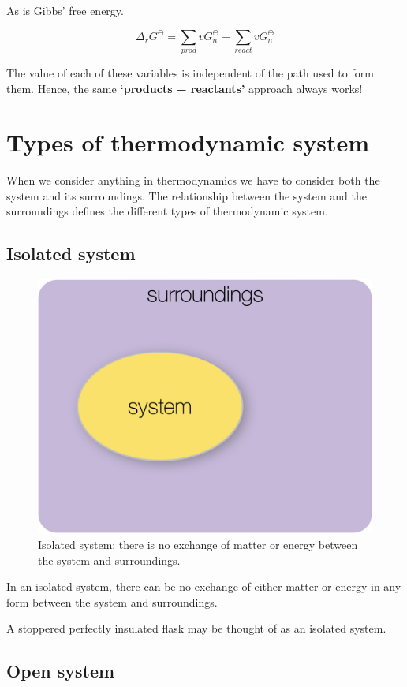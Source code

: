 \documentclass[
]{book}
\begin{document}
As is Gibbs' free energy.

\begin{equation}
\Delta _ r G^\ominus = \sum_{prod} v G_n^\ominus - \sum_{react} v  G_n^\ominus 
\label{eq:Gibbsstate}
\end{equation}

The value of each of these variables is independent of the path used to form them. Hence, the same \textbf{`products − reactants'} approach always works!

\hypertarget{sec:typesofsystem}{%
\section{Types of thermodynamic system}\label{sec:typesofsystem}}

When we consider anything in thermodynamics we have to consider both the system and its surroundings. The relationship between the system and the surroundings defines the different types of thermodynamic system.

\hypertarget{subsec:isolated}{%
\subsection{Isolated system}\label{subsec:isolated}}

\begin{figure}

{\centering \includegraphics[width=0.3\linewidth]{images/isolated} 

}

\caption{Isolated system: there is no exchange of matter or energy between the system and surroundings.}\label{fig:isolated}
\end{figure}

In an isolated system, there can be no exchange of either matter or energy in any form between the system and surroundings.

A stoppered perfectly insulated flask may be thought of as an isolated system.

\hypertarget{subsec:open}{%
\subsection{Open system}\label{subsec:open}}
\end{document}
